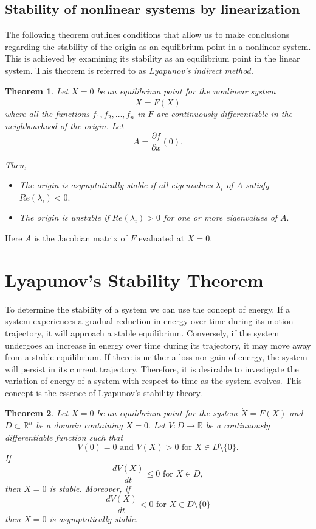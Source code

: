 \documentclass{article}
\newtheorem{theorem}{Theorem}
\begin{document}
\subsection{Stability of nonlinear systems by linearization}
The following theorem outlines conditions that allow us to make conclusions regarding the stability of the origin as an equilibrium point in a nonlinear system. This is achieved by examining its stability as an equilibrium point in the linear system. This theorem is referred to as \emph{Lyapunov's indirect method.}

\begin{theorem}\label{t2}
    Let $X=0$ be an equilibrium point for the nonlinear system
    $$\dot{X}=F(X)$$
    where all the functions $f_1,f_2,\dots,f_n$ in $F$ are continuously differentiable in the neighbourhood of the origin. Let 
    $$A=\frac{\partial{f}}{\partial{x}}(0).$$

    Then, 
    \begin{itemize}
        \item The origin is asymptotically stable if all eigenvalues $\lambda_i$ of $A$ satisfy $Re(\lambda_i)<0.$
        \item The origin is unstable if $Re(\lambda_i)>0$ for one or more eigenvalues of $A.$
    \end{itemize}
\end{theorem}
Here $A$ is the Jacobian matrix of $F$ evaluated at $X=0.$

\section{Lyapunov's Stability Theorem}
To determine the stability of a system we can use the concept of energy. If a system experiences a gradual reduction in energy over time during its motion trajectory, it will approach a stable equilibrium. Conversely, if the system undergoes an increase in energy over time during its trajectory, it may move away from a stable equilibrium. If there is neither a loss nor gain of energy, the system will persist in its current trajectory. Therefore, it is desirable to investigate the variation of energy of a system with respect to time as the system evolves. This concept is the essence of Lyapunov's stability theory. 

\begin{theorem}\label{t3}
    Let $X=0$ be an equilibrium point for the system $\dot{X}=F(X)$ and $D \subset \mathbb{R}^n$ be a domain containing $X=0.$ Let $V:D\to \mathbb{R}$ be a continuously differentiable function such that 
    $$V(0)=0 \text{  and  } V(X)>0 \text{  for  } X\in D\setminus \{0\}.$$
    If 
    $$\frac{dV(X)}{dt}\leq 0 \text{  for  } X\in D,$$
    then $X=0$ is stable. Moreover, if
    $$\frac{dV(X)}{dt} < 0 \text{  for  } X\in  D\setminus \{0\}$$
    then $X=0$ is asymptotically stable.
\end{theorem}
\end{document}
